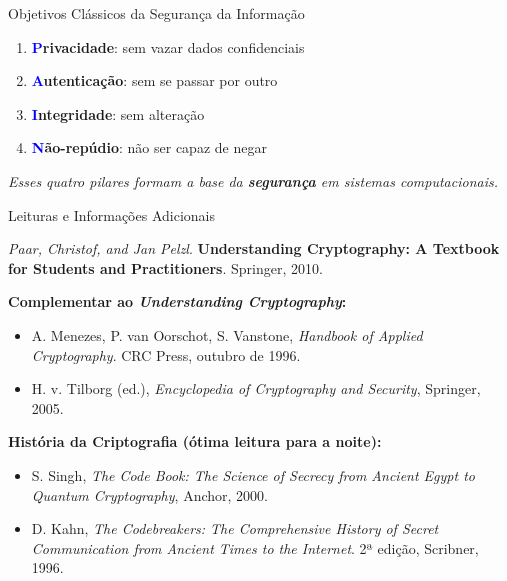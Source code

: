 \documentclass{beamer}
\begin{document}
\begin{frame}{Objetivos Clássicos da Segurança da Informação}

\begin{enumerate}
    \item \textbf{\textcolor{blue}{P}rivacidade}: sem vazar dados confidenciais
    \item \textbf{\textcolor{blue}{A}utenticação}: sem se passar por outro
    \item \textbf{\textcolor{blue}{I}ntegridade}: sem alteração
    \item \textbf{\textcolor{blue}{N}ão-repúdio}: não ser capaz de negar
\end{enumerate}

\vspace{1em}

\textit{Esses quatro pilares formam a base da \textbf{segurança} em sistemas computacionais.}

\end{frame}


\begin{frame}{Leituras e Informações Adicionais}

\textit{Paar, Christof, and Jan Pelzl}. \textbf{Understanding Cryptography: A Textbook for Students and Practitioners}. Springer, 2010.


\vspace{0.5cm}
\textbf{Complementar ao \textit{Understanding Cryptography}:}
\begin{itemize}
    \item A. Menezes, P. van Oorschot, S. Vanstone, \textit{Handbook of Applied Cryptography}. CRC Press, outubro de 1996.
    \item H. v. Tilborg (ed.), \textit{Encyclopedia of Cryptography and Security}, Springer, 2005.
\end{itemize}

\vspace{0.5cm}
\textbf{História da Criptografia (ótima leitura para a noite):}
\begin{itemize}
    \item S. Singh, \textit{The Code Book: The Science of Secrecy from Ancient Egypt to Quantum Cryptography}, Anchor, 2000.
    \item D. Kahn, \textit{The Codebreakers: The Comprehensive History of Secret Communication from Ancient Times to the Internet}. 2ª edição, Scribner, 1996.
\end{itemize}

\end{frame}
\end{document}
